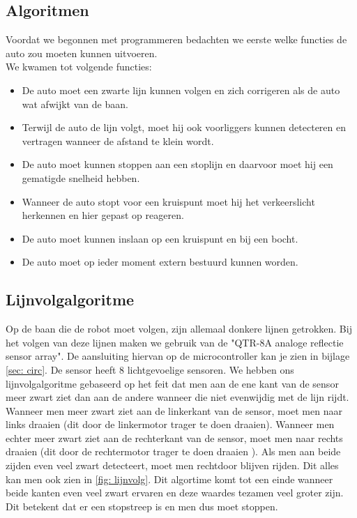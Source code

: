 \documentclass[a4paper,twoside,kulak]{kulakreport}
\begin{document}
	\subsection{Algoritmen}
	Voordat we begonnen met programmeren bedachten we eerste welke functies de auto zou moeten kunnen uitvoeren.\\
	We kwamen tot volgende functies:
	\begin{itemize}\item De auto moet een zwarte lijn kunnen volgen en zich corrigeren als de auto wat afwijkt van de baan.
		\item Terwijl de auto de lijn volgt, moet hij ook voorliggers kunnen detecteren en vertragen wanneer de afstand te klein wordt.
		\item De auto moet kunnen stoppen aan een stoplijn en daarvoor moet hij een gematigde snelheid hebben.
		\item Wanneer de auto stopt voor een kruispunt moet hij het verkeerslicht herkennen en hier gepast op reageren.
		\item De auto moet kunnen inslaan op een kruispunt en bij een bocht.
		\item De auto moet op ieder moment extern bestuurd kunnen worden.\end{itemize}
	
	
	\subsection{Lijnvolgalgoritme}
	Op de baan die de robot moet volgen, zijn allemaal donkere lijnen getrokken. Bij het volgen van deze lijnen maken we gebruik van de "QTR-8A analoge reflectie sensor array".
	De aansluiting hiervan op de microcontroller kan je zien in bijlage \ref{sec: circ}. De sensor heeft 8 lichtgevoelige sensoren. We hebben ons lijnvolgalgoritme gebaseerd op het feit dat men aan de ene kant van de sensor meer zwart ziet dan aan de andere wanneer die niet evenwijdig met de lijn rijdt. Wanneer men meer zwart ziet aan de linkerkant van de sensor, moet men naar links draaien (dit door de linkermotor trager te doen draaien). Wanneer men echter meer zwart ziet aan de rechterkant van de sensor, moet men naar rechts draaien (dit door de rechtermotor trager te doen draaien ). Als men aan beide zijden even veel zwart detecteert, moet men rechtdoor blijven rijden. Dit alles kan men ook zien in  \ref{fig: lijnvolg}. Dit algortime komt tot een einde wanneer beide kanten even veel zwart ervaren en deze waardes tezamen veel groter zijn. Dit betekent dat er een stopstreep is en men dus moet stoppen. 
	
\end{document}

